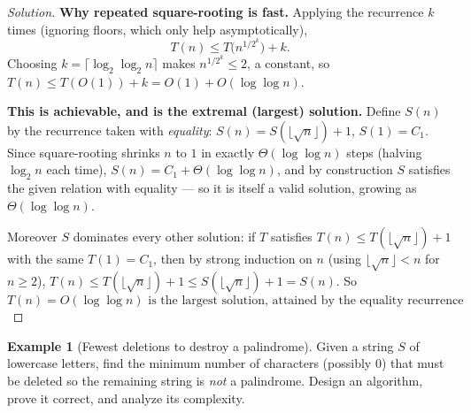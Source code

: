\documentclass[11pt]{article}
\theoremstyle{definition}
\newtheorem{example}{Example}[section]
\begin{document}
\begin{proof}[Solution]
\textbf{Why repeated square-rooting is fast.} Applying the recurrence $k$ times (ignoring floors, which only help asymptotically),
\[
T(n)\le T\big(n^{1/2^k}\big)+k.
\]
Choosing $k=\lceil\log_2\log_2 n\rceil$ makes $n^{1/2^k}\le2$, a constant, so $T(n)\le T(O(1))+k=O(1)+O(\log\log n)$.

\textbf{This is achievable, and is the extremal (largest) solution.} Define $S(n)$ by the recurrence taken with \emph{equality}: $S(n)=S(\lfloor\sqrt n\rfloor)+1$, $S(1)=C_1$. Since square-rooting shrinks $n$ to $1$ in exactly $\Theta(\log\log n)$ steps (halving $\log_2 n$ each time), $S(n)=C_1+\Theta(\log\log n)$, and by construction $S$ satisfies the given relation with equality — so it is itself a valid solution, growing as $\Theta(\log\log n)$.

Moreover $S$ dominates every other solution: if $T$ satisfies $T(n)\le T(\lfloor\sqrt n\rfloor)+1$ with the same $T(1)=C_1$, then by strong induction on $n$ (using $\lfloor\sqrt n\rfloor<n$ for $n\ge2$), $T(n)\le T(\lfloor\sqrt n\rfloor)+1\le S(\lfloor\sqrt n\rfloor)+1=S(n)$. So
\[
\boxed{T(n)=O(\log\log n) \text{ is the largest solution, attained by the equality recurrence}}.
\]
\end{proof}

\begin{example}[Fewest deletions to destroy a palindrome]
Given a string $S$ of lowercase letters, find the minimum number of characters (possibly $0$) that must be deleted so the remaining string is \emph{not} a palindrome. Design an algorithm, prove it correct, and analyze its complexity.
\end{example}
\end{document}
